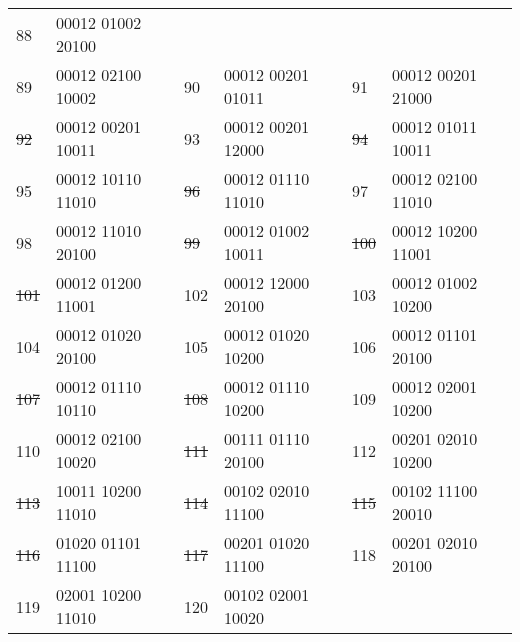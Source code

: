 \begin{tabular}{|l|l||l|l||l|l|}
{88} &00012 01002 20100 \\
{89} &00012 02100 10002 &
{90} &00012 00201 01011 &
{91} &00012 00201 21000 \\
\sout{92} &00012 00201 10011 &
{93} &00012 00201 12000 &
\sout{94} &00012 01011 10011 \\
{95} &00012 10110 11010 &
\sout{96} &00012 01110 11010 &
{97} &00012 02100 11010 \\
{98} &00012 11010 20100 &
\sout{99} &00012 01002 10011 &
\sout{100} &00012 10200 11001 \\
\sout{101} &00012 01200 11001 &
{102} &00012 12000 20100 &
{103} &00012 01002 10200 \\
{104} &00012 01020 20100 &
{105} &00012 01020 10200 &
{106} &00012 01101 20100 \\
\sout{107} &00012 01110 10110 &
\sout{108} &00012 01110 10200 &
{109} &00012 02001 10200 \\
{110} &00012 02100 10020 &
\sout{111} &00111 01110 20100 &
{112} &00201 02010 10200 \\
\sout{113} &10011 10200 11010 &
\sout{114} &00102 02010 11100 &
\sout{115} &00102 11100 20010 \\
\sout{116} &01020 01101 11100 &
\sout{117} &00201 01020 11100 &
{118} &00201 02010 20100 \\
{119} &02001 10200 11010 &
{120} &00102 02001 10020 &
 & \\\hline
\end{tabular}


